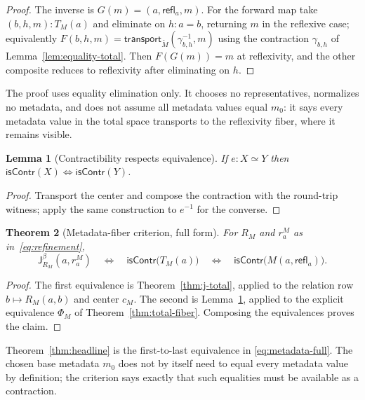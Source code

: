 \documentclass[10pt,reqno]{amsart}
\newtheorem{theorem}{Theorem}[section]
\newtheorem{lemma}[theorem]{Lemma}
\newcommand{\isContr}{\mathsf{isContr}}
\newcommand{\Eqv}{\simeq}
\newcommand{\Jbeta}{\mathsf J^\beta}
\newcommand{\refl}{\mathsf{refl}}
\newcommand{\transport}{\mathsf{transport}}
\begin{document}
\begin{proof}
The inverse is \(G(m)=(a,\refl_a,m)\).  For the forward map take
\((b,h,m):T_M(a)\) and eliminate on \(h:a=b\), returning \(m\) in the reflexive
case; equivalently
\(F(b,h,m)=\transport_{\widetilde M}(\gamma_{b,h}^{-1},m)\) using the
contraction \(\gamma_{b,h}\) of Lemma~\ref{lem:equality-total}.  Then
\(F(G(m))=m\) at reflexivity, and the other composite reduces to reflexivity
after eliminating on \(h\).
\end{proof}

The proof uses equality elimination only.  It chooses no representatives,
normalizes no metadata, and does not assume all metadata values equal \(m_0\):
it says every metadata value in the total space transports to the reflexivity
fiber, where it remains visible.

\begin{lemma}[Contractibility respects equivalence]
\label{lem:contr-equiv}
If \(e:X\Eqv Y\) then \(\isContr(X)\Longleftrightarrow\isContr(Y)\).
\end{lemma}

\begin{proof}
Transport the center and compose the contraction with the round-trip witness;
apply the same construction to \(e^{-1}\) for the converse.
\end{proof}

\begin{theorem}[Metadata-fiber criterion, full form]
\label{thm:metadata-fiber}
For \(R_M\) and \(r^M_a\) as in~\eqref{eq:refinement},
\[
 \Jbeta_{R_M}(a,r^M_a)
 \quad\Longleftrightarrow\quad
 \isContr\bigl(T_M(a)\bigr)
 \quad\Longleftrightarrow\quad
 \isContr\bigl(M(a,\refl_a)\bigr).
\tag{4.4}\label{eq:metadata-full}
\]
\end{theorem}

\begin{proof}
The first equivalence is Theorem~\ref{thm:j-total}, applied to the relation row
\(b\mapsto R_M(a,b)\) and center \(c_M\).  The second is
Lemma~\ref{lem:contr-equiv}, applied to the explicit equivalence
\(\Phi_M\) of Theorem~\ref{thm:total-fiber}.  Composing the equivalences proves
the claim.
\end{proof}

Theorem~\ref{thm:headline} is the first-to-last equivalence in
\eqref{eq:metadata-full}.  The chosen base metadata \(m_0\) does not by itself
need to equal every metadata value by definition; the criterion says exactly
that such equalities must be available as a contraction.
\end{document}
